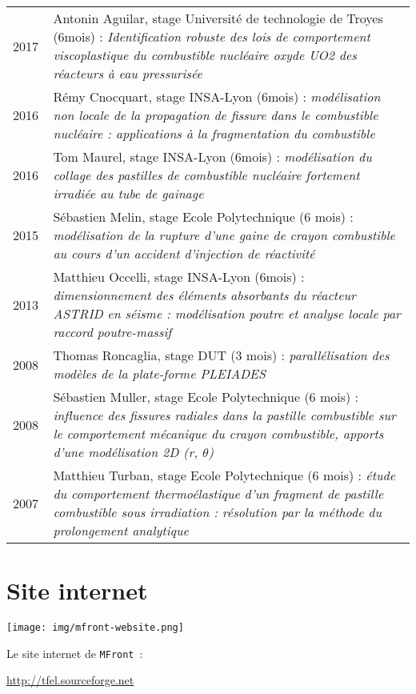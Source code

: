 \documentclass[11pt,a4paper]{moderncv}
\begin{document}
\begin{tabular}[htbp]{p{0.1\linewidth}p{0.9\linewidth}}
  2017 & Antonin Aguilar, stage Université de technologie de Troyes (6mois) : {\em Identification robuste des lois de comportement viscoplastique du combustible nucléaire oxyde UO2 des réacteurs à eau pressurisée} \\
  2016 & Rémy Cnocquart, stage INSA-Lyon (6mois) : {\em modélisation non locale de la propagation de fissure dans le combustible nucléaire : applications à la fragmentation du combustible} \\
  2016 & Tom Maurel, stage INSA-Lyon (6mois) : {\em modélisation du collage des pastilles de combustible nucléaire fortement irradiée au tube de gainage} \\
  2015 & Sébastien Melin, stage Ecole Polytechnique (6 mois) : {\em modélisation de la rupture d'une gaine de crayon combustible au cours d'un accident d'injection de réactivité} \\
  2013 & Matthieu Occelli, stage INSA-Lyon (6mois) : {\em dimensionnement des éléments absorbants du réacteur ASTRID en séisme : modélisation poutre et analyse locale par raccord poutre-massif} \\
  2008 & Thomas Roncaglia, stage DUT (3 mois) : {\em parallélisation des modèles de la plate-forme PLEIADES} \\
  2008 & Sébastien Muller, stage Ecole Polytechnique (6 mois) : {\em influence des fissures radiales dans la pastille combustible sur le comportement mécanique du crayon combustible, apports d’une modélisation 2D (r, \(\theta\))}  \\
  2007 & Matthieu Turban, stage Ecole Polytechnique (6 mois) : {\em étude du comportement thermoélastique d’un fragment de pastille combustible sous irradiation : résolution par la méthode du prolongement analytique} \\
\end{tabular}

\section{Site internet}

\begin{center}
  \texttt{[image: img/mfront-website.png]}
\end{center}

Le site internet de \texttt{MFront}~:
\begin{center}
  \url{http://tfel.sourceforge.net}  
\end{center}
\end{document}
